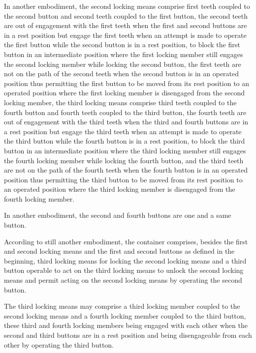 \documentclass[11pt,a4paper]{article}
\begin{document}
In another embodiment, the second locking means comprise first teeth coupled to the second button and second teeth coupled to the first button, the second teeth are out of engagement with the first teeth when the first and second buttons are in a rest position but engage the first teeth when an attempt is made to operate the first button while the second button is in a rest position, to block the first button in an intermediate position where the first locking member still engages the second locking member while locking the second button, the first teeth are not on the path of the second teeth when the second button is in an operated position thus permitting the first button to be moved from its rest position to an operated position where the first locking member is disengaged from the second locking member, the third locking means comprise third teeth coupled to the fourth button and fourth teeth coupled to the third button, the fourth teeth are out of engagement with the third teeth when the third and fourth buttons are in a rest position but engage the third teeth when an attempt is made to operate the third button while the fourth button is in a rest position, to block the third button in an intermediate position where the third locking member still engages the fourth locking member while locking the fourth button, and the third teeth are not on the path of the fourth teeth when the fourth button is in an operated position thus permitting the third button to be moved from its rest position to an operated position where the third locking member is disengaged from the fourth locking member.

In another embodiment, the second and fourth buttons are one and a same button.

According to still another embodiment, the container comprises, besides the first and second locking means and the first and second buttons as defined in the beginning, third locking means for locking the second locking means and a third button operable to act on the third locking means to unlock the second locking means and permit acting on the second locking means by operating the second button.

The third locking means may comprise a third locking member coupled to the second locking means and a fourth locking member coupled to the third button, these third and fourth locking members being engaged with each other when the second and third buttons are in a rest position and being disengageable from each other by operating the third button.
\end{document}
